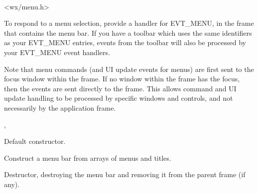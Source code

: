 
\\


<wx/menu.h>


To respond to a menu selection, provide a handler for EVT\_MENU, in the frame
that contains the menu bar. If you have a toolbar which uses the same identifiers
as your EVT\_MENU entries, events from the toolbar will also be processed by your
EVT\_MENU event handlers.

Note that menu commands (and UI update events for menus) are first sent to
the focus window within the frame. If no window within the frame has the focus,
then the events are sent directly to the frame. This allows command and UI update
handling to be processed by specific windows and controls, and not necessarily
by the application frame.


, 


\label{wxmenubarconstr}


Default constructor.


Construct a menu bar from arrays of menus and titles.









Destructor, destroying the menu bar and removing it from the parent frame (if any).


